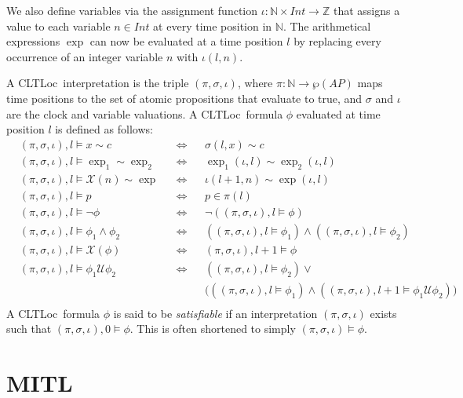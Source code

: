 \documentclass[a4paper,11pt]{report}
\theoremstyle{definition}
\newcommand{\cltloc}{CLTLoc}
\begin{document}
We also define variables via the assignment function
$\iota : \mathbb{N} \times Int \rightarrow \mathbb{Z}$ that assigns a value to
each variable $n \in Int$ at every time position in $\mathbb{N}$. The
arithmetical expressions $\exp$ can now be evaluated at a time position $l$ by
replacing every occurrence of an integer variable $n$ with $\iota(l,n)$.

A \cltloc\ interpretation is the triple $(\pi, \sigma, \iota)$, where
$\pi: \mathbb{N} \rightarrow \wp(AP)$ maps time positions to the set of atomic
propositions that evaluate to true, and $\sigma$ and $\iota$ are the clock and
variable valuations. A \cltloc\ formula $\phi$ evaluated at time position $l$ is
defined as follows:
\begin{align*}
  &(\pi,\sigma,\iota),l \vDash x \sim c && \Leftrightarrow && \sigma(l,x) \sim c \\
  &(\pi,\sigma,\iota),l \vDash \exp_{1} \sim \exp_{2} && \Leftrightarrow && \exp_{1}(\iota,l) \sim \exp_{2}(\iota,l) \\
  &(\pi,\sigma,\iota),l \vDash \mathcal{X}(n) \sim \exp && \Leftrightarrow && \iota(l{+}1,n) \sim \exp(\iota,l) \\
  &(\pi,\sigma,\iota),l \vDash p && \Leftrightarrow && p \in \pi(l) \\
  &(\pi,\sigma,\iota),l \vDash \neg \phi && \Leftrightarrow && \neg ((\pi,\sigma,\iota),l \vDash \phi) \\
  &(\pi,\sigma,\iota),l \vDash \phi_{1} \land \phi_{2} && \Leftrightarrow &&((\pi,\sigma,\iota),l \vDash \phi_{1}) \land ((\pi,\sigma,\iota),l \vDash \phi_{2}) \\
  &(\pi,\sigma,\iota),l \vDash \mathcal{X}(\phi) && \Leftrightarrow && (\pi,\sigma,\iota),l{+}1 \vDash \phi \\
  &(\pi,\sigma,\iota),l \vDash \phi_{1} \mathcal{U} \phi_{2} && \Leftrightarrow &&((\pi,\sigma,\iota),l \vDash \phi_{2}) \lor \\
  &&&&& \bigg(((\pi,\sigma,\iota),l \vDash \phi_{1}) \land ((\pi,\sigma,\iota),l{+}1 \vDash \phi_{1} \mathcal{U} \phi_{2}) \bigg) \\
\end{align*}
A \cltloc\ formula $\phi$ is said to be \emph{satisfiable} if an interpretation
$(\pi,\sigma,\iota)$ exists such that $(\pi,\sigma,\iota),0 \vDash \phi$. This
is often shortened to simply $(\pi,\sigma,\iota) \vDash \phi$.


\section{MITL}\label{mitl}
\end{document}

